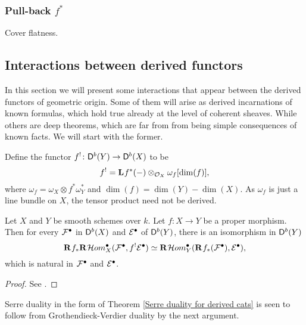 \subsubsection{Pull-back $f^*$}

Cover flatness.

\subsection{Interactions between derived functors}
\label{Subsection: Interactions between derived functors}

In this section we will present some interactions that appear between the derived functors of geometric origin. Some of them will arise as derived incarnations of known formulas, which hold true already at the level of coherent sheaves. While others are deep theorems, which are far from from being simple consequences of known facts. We will start with the former.


Define the functor $f^! \colon \mathsf{D}^b(Y) \to \mathsf{D}^b(X)$ to be
\[
    f^! = \mathbf{L}^{}f^*(-) \otimes_{{\mathcal{O}_{X}}} \omega_f[\dim(f)],
\]
where $\omega_f = \omega_X \otimes f^*\omega_Y^*$ and $\dim(f) = \dim(Y) - \dim(X)$. As $\omega_f$ is just a line bundle on $X$, the tensor product need not be derived. 

\begin{theorem}
    \label{Grothendieck-Verdier duality}
    Let $X$ and $Y$ be smooth schemes over $k$. Let $f \colon X \to Y$ be a proper morphism. Then for every $\mathcal F^\bullet$ in $\mathsf{D}^b(X)$ and $\mathcal E^\bullet$ of $\mathsf{D}^b(Y)$, there is an isomorphism in $\mathsf{D}^b(Y)$
    \[
        \rderived{}{f_*}\rderived{}{\localhom^\bullet_X}(\F^\bullet, f^! \E^\bullet) \iso \rderived{}{\localhom^\bullet_Y}(\rderived{}{f_*}(\F^\bullet), \E^\bullet),
    \]
    which is natural in $\mathcal F^\bullet$ and $\mathcal E^\bullet$.
\end{theorem}

\begin{proof}
    See \cite[Chapter VII, \S 4, Corollary 4.3]{Hartshorne1966}.
\end{proof}

\begin{remark}
    Serre duality in the form of Theorem \ref{Serre duality for derived cats} is seen to follow from Grothendieck-Verdier duality by the next argument.
\end{remark}

